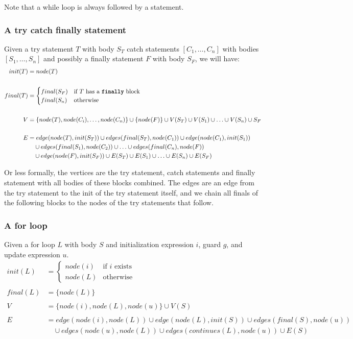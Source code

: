 Note that a while loop is always followed by a 
statement.

\subsubsection*{A try catch finally statement}
Given a try statement $T$ with body $S_T$ catch statements $[C_1, \ldots, C_n]$
with bodies $[S_1, \ldots, S_n]$ and possibly a finally statement $F$ with body
$S_F$, we will have:
\begin{align*}
    init(T)  &= node(T) \\ \\
    final(T) &= 
    \begin{cases}
        final(S_F) & \text{if } T \text{ has a \javainline{finally} block}  \\
        final(S_n) & \text{otherwise}
    \end{cases} \\ \\
    V &= \{node(T), node(C_i), \ldots, node(C_n) \} \cup \{node(F)\} \cup V(S_T) \cup V(S_1) \cup \ldots \cup V(S_n) \cup S_F \\ \\
    E &= edge(node(T), init(S_T)) \cup edges(final(S_T), node(C_1)) \cup edge(node(C_1), init(S_1)) 
        \\ & \quad \cup edges(final(S_1), node(C_2)) \cup \ldots \cup edges(final(C_n), node(F))
        \\ & \quad  \cup edge(node(F), init(S_F)) \cup E(S_T) \cup E(S_1) \cup \ldots \cup E(S_n) \cup E(S_F) 
\end{align*}

Or less formally, the vertices are the try statement, catch statements and finally
statement with all bodies of these blocks combined. The edges are an edge from
the try statement to the init of the try statement itself, and we chain all
finals of the following blocks to the nodes of the try statements that follow.

\subsubsection*{A for loop}
Given a for loop $L$ with body $S$ and initialization expression $i$, guard $g$,
and update expression $u$.
\begin{align*}
    init(L) &= 
    \begin{cases}
        node(i) & \text{if }i \text{ exists} \\
        node(L) & \text{otherwise}
    \end{cases} \\ \\
    final(L) &= \{node(L)\} \\ \\
    V        &= \{node(i), node(L), node(u)\} \cup V(S) \\ \\ 
    E        &= edge(node(i), node(L)) \cup edge(node(L), init(S)) \cup edges(final(S), node(u))
                \\ & \quad \cup edges(node(u), node(L)) \cup edges(continues(L), node(u)) \cup E(S)
\end{align*}

